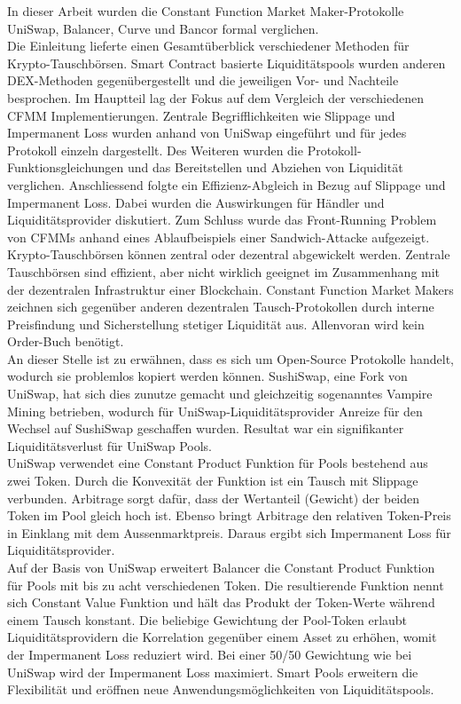 \documentclass[12pt,a4paper,titlepage,oneside,english]{article}
\begin{document}
In dieser Arbeit wurden die Constant Function Market Maker-Protokolle UniSwap, Balancer, Curve und Bancor formal verglichen. \\
Die Einleitung lieferte einen Gesamtüberblick verschiedener Methoden für Krypto-Tauschbörsen. Smart Contract basierte Liquiditätspools wurden anderen DEX-Methoden gegenübergestellt und die jeweiligen Vor- und Nachteile besprochen.
Im Hauptteil lag der Fokus auf dem Vergleich der verschiedenen CFMM Implementierungen. Zentrale Begrifflichkeiten wie Slippage und Impermanent Loss wurden anhand von UniSwap eingeführt und für jedes Protokoll einzeln dargestellt. Des Weiteren wurden die Protokoll-Funktionsgleichungen und das Bereitstellen und Abziehen von Liquidität verglichen. 
Anschliessend folgte ein Effizienz-Abgleich in Bezug auf Slippage und Impermanent Loss. Dabei wurden die Auswirkungen für Händler und Liquiditätsprovider diskutiert. Zum Schluss wurde das Front-Running Problem von CFMMs anhand eines Ablaufbeispiels einer Sandwich-Attacke aufgezeigt.
\newpage
Krypto-Tauschbörsen können zentral oder dezentral abgewickelt werden. Zentrale Tauschbörsen sind effizient, aber nicht wirklich geeignet im Zusammenhang mit der dezentralen Infrastruktur einer Blockchain. Constant Function Market Makers zeichnen sich gegenüber anderen dezentralen Tausch-Protokollen durch interne Preisfindung und Sicherstellung stetiger Liquidität aus. Allenvoran wird kein Order-Buch benötigt.\\ An dieser Stelle ist zu erwähnen, dass es sich um Open-Source Protokolle handelt, wodurch sie problemlos kopiert werden können. SushiSwap, eine Fork von UniSwap, hat sich dies zunutze gemacht und gleichzeitig sogenanntes Vampire Mining betrieben, wodurch für UniSwap-Liquiditätsprovider Anreize für den Wechsel auf SushiSwap geschaffen wurden. Resultat war ein signifikanter Liquiditätsverlust für UniSwap Pools. \citep[vgl.][]{Defiant2020} \\
UniSwap verwendet eine Constant Product Funktion für Pools bestehend aus zwei Token. Durch die Konvexität der Funktion ist ein Tausch mit Slippage verbunden. Arbitrage sorgt dafür, dass der Wertanteil (Gewicht) der beiden Token im Pool gleich hoch ist. Ebenso bringt Arbitrage den relativen Token-Preis in Einklang mit dem Aussenmarktpreis. Daraus ergibt sich Impermanent Loss für Liquiditätsprovider.\\
Auf der Basis von UniSwap erweitert Balancer die Constant Product Funktion für Pools mit bis zu acht verschiedenen Token. Die resultierende Funktion nennt sich Constant Value Funktion und hält das Produkt der Token-Werte während einem Tausch konstant. Die beliebige Gewichtung der Pool-Token erlaubt Liquiditätsprovidern die Korrelation gegenüber einem Asset zu erhöhen, womit der Impermanent Loss reduziert wird. Bei einer 50/50 Gewichtung wie bei UniSwap wird der Impermanent Loss maximiert. Smart Pools erweitern die Flexibilität und eröffnen neue Anwendungsmöglichkeiten von Liquiditätspools. \\
\end{document}
